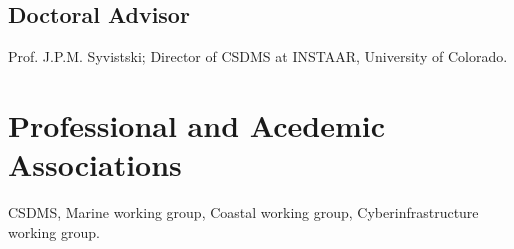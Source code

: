 \documentclass[letterpaper]{resume}
\begin{document}
\subsection{Doctoral Advisor}
\begin{compactitem}[\itembullet]
  \item Prof. J.P.M. Syvistski; Director of CSDMS at INSTAAR, University of Colorado.
\end{compactitem}

\section{Professional and Acedemic Associations}
CSDMS, Marine working group, Coastal working group, Cyberinfrastructure working group.


\nocite{}
\end{document}
